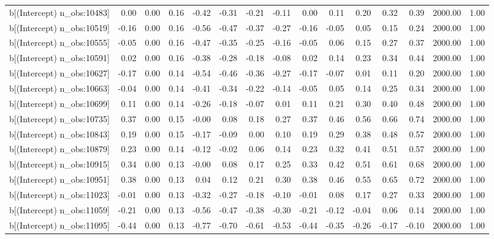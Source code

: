 \begin{table}[ht]
\begin{tabular}{rrrrrrrrrrrrrrr}
  b[(Intercept) n\_obs:10483] & 0.00 & 0.00 & 0.16 & -0.42 & -0.31 & -0.21 & -0.11 & 0.00 & 0.11 & 0.20 & 0.32 & 0.39 & 2000.00 & 1.00 \\ 
  b[(Intercept) n\_obs:10519] & -0.16 & 0.00 & 0.16 & -0.56 & -0.47 & -0.37 & -0.27 & -0.16 & -0.05 & 0.05 & 0.15 & 0.24 & 2000.00 & 1.00 \\ 
  b[(Intercept) n\_obs:10555] & -0.05 & 0.00 & 0.16 & -0.47 & -0.35 & -0.25 & -0.16 & -0.05 & 0.06 & 0.15 & 0.27 & 0.37 & 2000.00 & 1.00 \\ 
  b[(Intercept) n\_obs:10591] & 0.02 & 0.00 & 0.16 & -0.38 & -0.28 & -0.18 & -0.08 & 0.02 & 0.14 & 0.23 & 0.34 & 0.44 & 2000.00 & 1.00 \\ 
  b[(Intercept) n\_obs:10627] & -0.17 & 0.00 & 0.14 & -0.54 & -0.46 & -0.36 & -0.27 & -0.17 & -0.07 & 0.01 & 0.11 & 0.20 & 2000.00 & 1.00 \\ 
  b[(Intercept) n\_obs:10663] & -0.04 & 0.00 & 0.14 & -0.41 & -0.34 & -0.22 & -0.14 & -0.05 & 0.05 & 0.14 & 0.25 & 0.34 & 2000.00 & 1.00 \\ 
  b[(Intercept) n\_obs:10699] & 0.11 & 0.00 & 0.14 & -0.26 & -0.18 & -0.07 & 0.01 & 0.11 & 0.21 & 0.30 & 0.40 & 0.48 & 2000.00 & 1.00 \\ 
  b[(Intercept) n\_obs:10735] & 0.37 & 0.00 & 0.15 & -0.00 & 0.08 & 0.18 & 0.27 & 0.37 & 0.46 & 0.56 & 0.66 & 0.74 & 2000.00 & 1.00 \\ 
  b[(Intercept) n\_obs:10843] & 0.19 & 0.00 & 0.15 & -0.17 & -0.09 & 0.00 & 0.10 & 0.19 & 0.29 & 0.38 & 0.48 & 0.57 & 2000.00 & 1.00 \\ 
  b[(Intercept) n\_obs:10879] & 0.23 & 0.00 & 0.14 & -0.12 & -0.02 & 0.06 & 0.14 & 0.23 & 0.32 & 0.41 & 0.51 & 0.57 & 2000.00 & 1.00 \\ 
  b[(Intercept) n\_obs:10915] & 0.34 & 0.00 & 0.13 & -0.00 & 0.08 & 0.17 & 0.25 & 0.33 & 0.42 & 0.51 & 0.61 & 0.68 & 2000.00 & 1.00 \\ 
  b[(Intercept) n\_obs:10951] & 0.38 & 0.00 & 0.13 & 0.04 & 0.12 & 0.21 & 0.30 & 0.38 & 0.46 & 0.55 & 0.65 & 0.72 & 2000.00 & 1.00 \\ 
  b[(Intercept) n\_obs:11023] & -0.01 & 0.00 & 0.13 & -0.32 & -0.27 & -0.18 & -0.10 & -0.01 & 0.08 & 0.17 & 0.27 & 0.33 & 2000.00 & 1.00 \\ 
  b[(Intercept) n\_obs:11059] & -0.21 & 0.00 & 0.13 & -0.56 & -0.47 & -0.38 & -0.30 & -0.21 & -0.12 & -0.04 & 0.06 & 0.14 & 2000.00 & 1.00 \\ 
  b[(Intercept) n\_obs:11095] & -0.44 & 0.00 & 0.13 & -0.77 & -0.70 & -0.61 & -0.53 & -0.44 & -0.35 & -0.26 & -0.17 & -0.10 & 2000.00 & 1.00 \\ 

\end{tabular}
\end{table}
